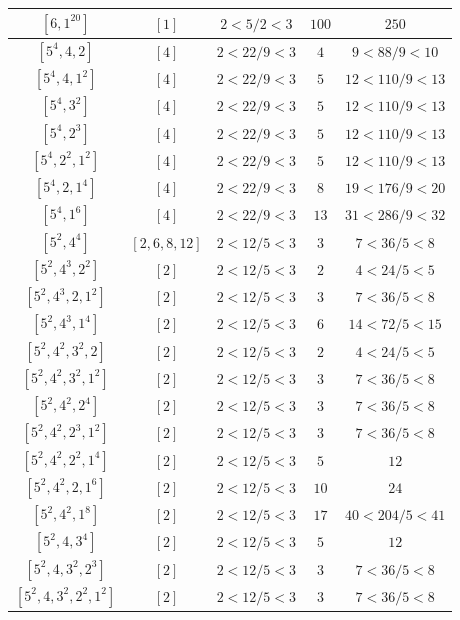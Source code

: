\documentclass{article}%
\begin{document}
\begin{center}
\begin{longtable}{||c|c|c|c|c||}
$[6, 1^{20}]$ & $[1]$ & $2 < 5/2 < 3$ & $100$ & $250$ \\ \hline 
$[5^{4}, 4, 2]$ & $[4]$ & $2 < 22/9 < 3$ & $4$ & $9 < 88/9 < 10$ \\ \hline 
$[5^{4}, 4, 1^{2}]$ & $[4]$ & $2 < 22/9 < 3$ & $5$ & $12 < 110/9 < 13$ \\ \hline 
$[5^{4}, 3^{2}]$ & $[4]$ & $2 < 22/9 < 3$ & $5$ & $12 < 110/9 < 13$ \\ \hline 
$[5^{4}, 2^{3}]$ & $[4]$ & $2 < 22/9 < 3$ & $5$ & $12 < 110/9 < 13$ \\ \hline 
$[5^{4}, 2^{2}, 1^{2}]$ & $[4]$ & $2 < 22/9 < 3$ & $5$ & $12 < 110/9 < 13$ \\ \hline 
$[5^{4}, 2, 1^{4}]$ & $[4]$ & $2 < 22/9 < 3$ & $8$ & $19 < 176/9 < 20$ \\ \hline 
$[5^{4}, 1^{6}]$ & $[4]$ & $2 < 22/9 < 3$ & $13$ & $31 < 286/9 < 32$ \\ \hline 
$[5^{2}, 4^{4}]$ & $[2, 6, 8, 12]$ & $2 < 12/5 < 3$ & $3$ & $7 < 36/5 < 8$ \\ \hline 
$[5^{2}, 4^{3}, 2^{2}]$ & $[2]$ & $2 < 12/5 < 3$ & $2$ & $4 < 24/5 < 5$ \\ \hline 
$[5^{2}, 4^{3}, 2, 1^{2}]$ & $[2]$ & $2 < 12/5 < 3$ & $3$ & $7 < 36/5 < 8$ \\ \hline 
$[5^{2}, 4^{3}, 1^{4}]$ & $[2]$ & $2 < 12/5 < 3$ & $6$ & $14 < 72/5 < 15$ \\ \hline 
$[5^{2}, 4^{2}, 3^{2}, 2]$ & $[2]$ & $2 < 12/5 < 3$ & $2$ & $4 < 24/5 < 5$ \\ \hline 
$[5^{2}, 4^{2}, 3^{2}, 1^{2}]$ & $[2]$ & $2 < 12/5 < 3$ & $3$ & $7 < 36/5 < 8$ \\ \hline 
$[5^{2}, 4^{2}, 2^{4}]$ & $[2]$ & $2 < 12/5 < 3$ & $3$ & $7 < 36/5 < 8$ \\ \hline 
$[5^{2}, 4^{2}, 2^{3}, 1^{2}]$ & $[2]$ & $2 < 12/5 < 3$ & $3$ & $7 < 36/5 < 8$ \\ \hline 
$[5^{2}, 4^{2}, 2^{2}, 1^{4}]$ & $[2]$ & $2 < 12/5 < 3$ & $5$ & $12$ \\ \hline 
$[5^{2}, 4^{2}, 2, 1^{6}]$ & $[2]$ & $2 < 12/5 < 3$ & $10$ & $24$ \\ \hline 
$[5^{2}, 4^{2}, 1^{8}]$ & $[2]$ & $2 < 12/5 < 3$ & $17$ & $40 < 204/5 < 41$ \\ \hline 
$[5^{2}, 4, 3^{4}]$ & $[2]$ & $2 < 12/5 < 3$ & $5$ & $12$ \\ \hline 
$[5^{2}, 4, 3^{2}, 2^{3}]$ & $[2]$ & $2 < 12/5 < 3$ & $3$ & $7 < 36/5 < 8$ \\ \hline 
$[5^{2}, 4, 3^{2}, 2^{2}, 1^{2}]$ & $[2]$ & $2 < 12/5 < 3$ & $3$ & $7 < 36/5 < 8$ \\ \hline 

\end{longtable}
\end{center}
\end{document}
